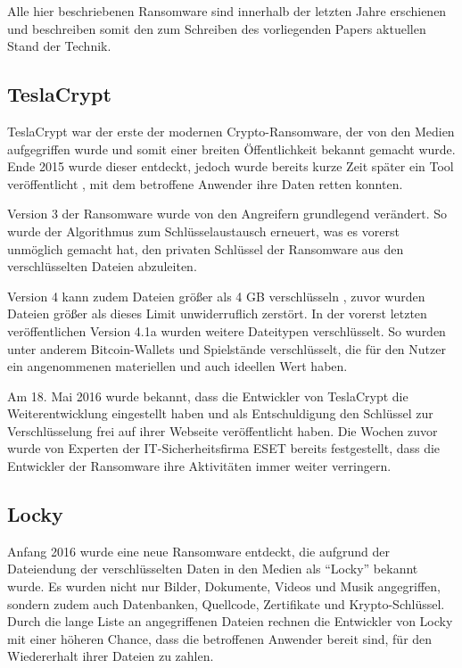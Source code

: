 Alle hier beschriebenen Ransomware sind innerhalb der letzten Jahre erschienen und beschreiben somit den zum Schreiben des vorliegenden Papers aktuellen Stand der Technik.

\subsection{TeslaCrypt}
TeslaCrypt war der erste der modernen Crypto-Ransomware, der von den Medien aufgegriffen wurde und somit einer breiten Öffentlichkeit bekannt gemacht wurde. Ende 2015 \cite{tesla:entdeckt} wurde dieser entdeckt, jedoch wurde bereits kurze Zeit später ein Tool veröffentlicht \cite{tesla:geknackt}, mit dem betroffene Anwender ihre Daten retten konnten.

Version 3 der Ransomware wurde von den Angreifern grundlegend verändert. So wurde der Algorithmus zum Schlüsselaustausch erneuert, was es vorerst unmöglich gemacht hat, den privaten Schlüssel der Ransomware aus den verschlüsselten Dateien abzuleiten. \cite{tesla:version3} \cite{tesla:version3_2}

Version 4 kann zudem Dateien größer als 4 GB verschlüsseln \cite{tesla:version4}, zuvor wurden Dateien größer als dieses Limit unwiderruflich zerstört. In der vorerst letzten veröffentlichen Version 4.1a \cite{tesla:version41} wurden weitere Dateitypen verschlüsselt. So wurden unter anderem Bitcoin-Wallets und Spielstände verschlüsselt, die für den Nutzer ein angenommenen materiellen und auch ideellen Wert haben.

Am 18. Mai 2016 wurde bekannt, dass die Entwickler von TeslaCrypt die Weiterentwicklung eingestellt haben und als Entschuldigung den Schlüssel zur Verschlüsselung frei auf ihrer Webseite veröffentlicht haben. Die Wochen zuvor wurde von Experten der IT-Sicherheitsfirma ESET bereits festgestellt, dass die Entwickler der Ransomware ihre Aktivitäten immer weiter verringern. \cite{tesla:end}

\subsection{Locky}
Anfang 2016 wurde eine neue Ransomware entdeckt, die aufgrund der Dateiendung der verschlüsselten Daten in den Medien als ``Locky'' bekannt wurde. Es wurden nicht nur Bilder, Dokumente, Videos und Musik angegriffen, sondern zudem auch Datenbanken, Quellcode, Zertifikate und Krypto-Schlüssel. Durch die lange Liste an angegriffenen Dateien rechnen die Entwickler von Locky mit einer höheren Chance, dass die betroffenen Anwender bereit sind, für den Wiedererhalt ihrer Dateien zu zahlen.

